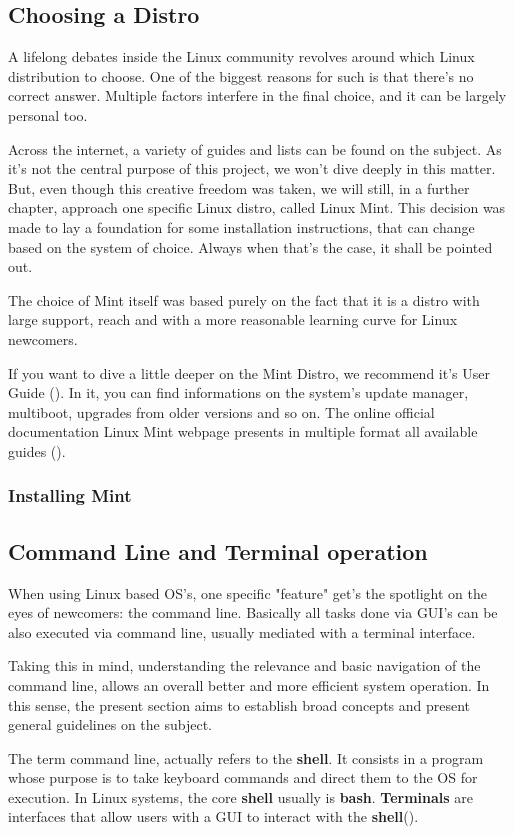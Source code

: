 \documentclass[a4paper,11pt]{article}
\begin{document}
\subsection{Choosing a Distro}
A lifelong debates inside the Linux community revolves around which  Linux
distribution to choose. One of the biggest reasons for such is that there's no
correct answer. Multiple factors interfere in the final choice, and it can be
largely personal too.\par
Across the internet, a variety of guides and lists can be found on the subject.
As it's not the central purpose of this project, we won't dive deeply in this
matter. But, even though this creative freedom was taken, we will still, in
a further chapter, approach one specific Linux distro, called Linux Mint. This
decision was made to lay a foundation for some installation instructions, that
can change based on the system of choice. Always when that's the case, it shall
be pointed out.\par
The choice of Mint itself was based purely on the fact that it is a distro with
large support, reach and with a more reasonable learning curve for Linux
newcomers.

\begin{tipbox}
    If you want to dive a little deeper on the Mint Distro, we recommend it's
    User Guide (\cite{mintUserGuideLinux2024}). In it, you can find informations
    on the system's update manager, multiboot, upgrades from older versions and
    so on. The online official documentation Linux Mint webpage presents in
    multiple format all available guides (\cite{mintLinuxMintDocumentation2025}). 
\end{tipbox}


\subsubsection{Installing Mint}

\subsection{Command Line and Terminal operation}
When using Linux based OS's, one specific "feature" get's the spotlight on the
eyes of newcomers: the command line. Basically all tasks done via GUI's can be
also executed via command line, usually mediated with a terminal interface.\par
Taking this in mind, understanding the relevance and basic navigation of the
command line, allows an overall better and more efficient system operation. In
this sense, the present section aims to establish broad concepts and present
general guidelines on the subject.
\begin{definitionbox}
    The term command line, actually refers to the \textbf{shell}. It consists in
    a program whose purpose is to take keyboard commands and direct them to the
    OS for execution. In Linux systems, the core \textbf{shell} usually is
    \textbf{bash}. \textbf{Terminals} are interfaces that allow users with a GUI to
    interact with the \textbf{shell}(\cite{shottsLinuxCommandLine2024}).
\end{definitionbox}
\end{document}
